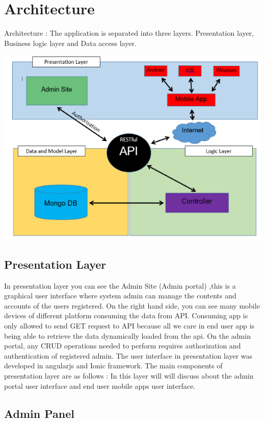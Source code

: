 	\section{Architecture}
	Architecture : The application is separated into three layers.  Presentation layer, Business logic layer and Data access layer.
	\begin{center}    
		\includegraphics{img/architecture.PNG}
	\end{center}
		\subsection{Presentation Layer}
		 In presentation layer you can see the Admin Site (Admin portal) ,this is a graphical user interface where system admin can manage the contents and accounts of the users registered.  On the right hand side, you can see many mobile devices of different platform consuming the data from API. Consuming app is only allowed to send GET request to API because all we care in end user app is being able to retrieve the data dynamically loaded from the api. On the admin portal, any CRUD operations needed to perform requires authorization and authentication of registered admin. The user interface in presentation layer was developed in angularjs and Ionic framework. The main components of presentation layer are as follows : In this layer will will discuss about the admin portal user interface and end user mobile apps user interface.
		 \subsection{Admin Panel} 
		
